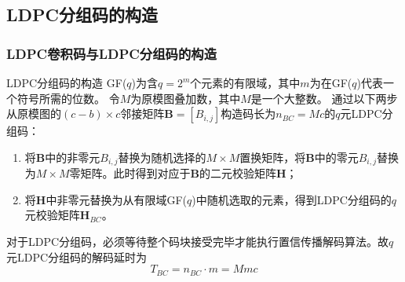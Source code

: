 \documentclass{beamer}
\begin{document}
\subsection{LDPC分组码的构造}
\begin{frame}[shrink]
	\frametitle{LDPC卷积码与LDPC分组码的构造}
		\begin{block}{LDPC分组码的构造}
GF($q$)为含$q=2^m$个元素的有限域，其中$m$为在GF($q$)代表一个符号所需的位数。
令$M$为原模图叠加数，其中$M$是一个大整数。
通过以下两步从原模图的$(c-b)\times c$邻接矩阵$\mathbf{B}=[B_{i,j}]$构造码长为$n_{BC}=Mc$的$q$元LDPC分组码：
\begin{enumerate}
\item 将$\mathbf{B}$中的非零元$B_{i,j}$替换为随机选择的$M \times M$置换矩阵，将$\mathbf{B}$中的零元$B_{i,j}$替换为$M \times M$零矩阵。此时得到对应于$\mathbf{B}$的二元校验矩阵$\mathbf{H}$；
\item 将$\mathbf{H}$中非零元替换为从有限域GF($q$)中随机选取的元素，得到LDPC分组码的$q$元校验矩阵$\mathbf{H}_{BC}$。
\end{enumerate}
对于LDPC分组码，必须等待整个码块接受完毕才能执行置信传播解码算法。故$q$元LDPC分组码的解码延时为
\begin{equation*}
T_{BC}=n_{BC}\cdot m = Mmc
\end{equation*}
		\end{block}
\end{frame}
\end{document}
